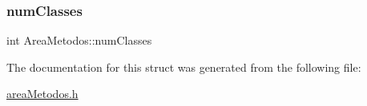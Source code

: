 \mbox{\label{structAreaMetodos_a16f79347136c9dda54c97a62bd596887}} 
\subsubsection{\texorpdfstring{num\+Classes}{numClasses}}
{\footnotesize\ttfamily int Area\+Metodos\+::num\+Classes}



The documentation for this struct was generated from the following file\+:\begin{DoxyCompactItemize}
\item 
\hyperlink{areaMetodos_8h}{area\+Metodos.\+h}\end{DoxyCompactItemize}
